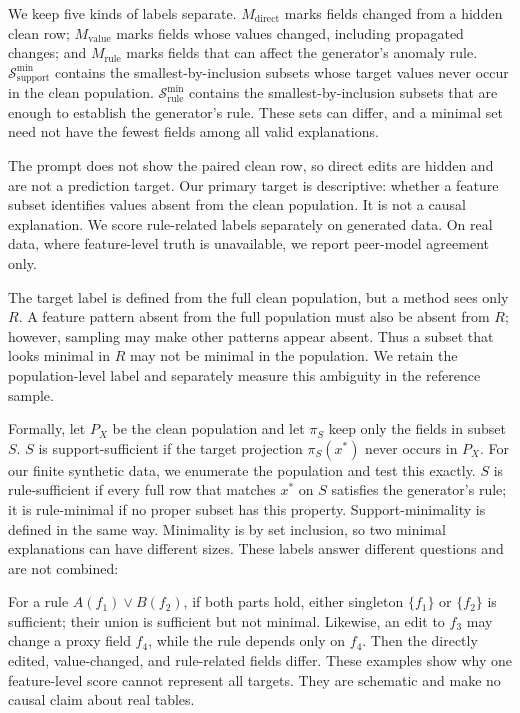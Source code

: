 \documentclass[conference]{IEEEtran}
\begin{document}
We keep five kinds of labels separate. $M_{\mathrm{direct}}$ marks fields changed from a hidden clean row; $M_{\mathrm{value}}$ marks fields whose values changed, including propagated changes; and $M_{\mathrm{rule}}$ marks fields that can affect the generator's anomaly rule. $\mathcal{S}_{\mathrm{support}}^{\min}$ contains the smallest-by-inclusion subsets whose target values never occur in the clean population. $\mathcal{S}_{\mathrm{rule}}^{\min}$ contains the smallest-by-inclusion subsets that are enough to establish the generator's rule. These sets can differ, and a minimal set need not have the fewest fields among all valid explanations.

The prompt does not show the paired clean row, so direct edits are hidden and are not a prediction target. Our primary target is descriptive: whether a feature subset identifies values absent from the clean population. It is not a causal explanation. We score rule-related labels separately on generated data. On real data, where feature-level truth is unavailable, we report peer-model agreement only.

The target label is defined from the full clean population, but a method sees only $R$. A feature pattern absent from the full population must also be absent from $R$; however, sampling may make other patterns appear absent. Thus a subset that looks minimal in $R$ may not be minimal in the population. We retain the population-level label and separately measure this ambiguity in the reference sample.

Formally, let $P_X$ be the clean population and let $\pi_S$ keep only the fields in subset $S$. $S$ is support-sufficient if the target projection $\pi_S(x^*)$ never occurs in $P_X$. For our finite synthetic data, we enumerate the population and test this exactly. $S$ is rule-sufficient if every full row that matches $x^*$ on $S$ satisfies the generator's rule; it is rule-minimal if no proper subset has this property. Support-minimality is defined in the same way. Minimality is by set inclusion, so two minimal explanations can have different sizes. These labels answer different questions and are not combined:

For a rule $A(f_1)\lor B(f_2)$, if both parts hold, either singleton $\{f_1\}$ or $\{f_2\}$ is sufficient; their union is sufficient but not minimal. Likewise, an edit to $f_3$ may change a proxy field $f_4$, while the rule depends only on $f_4$. Then the directly edited, value-changed, and rule-related fields differ. These examples show why one feature-level score cannot represent all targets. They are schematic and make no causal claim about real tables.
\end{document}
